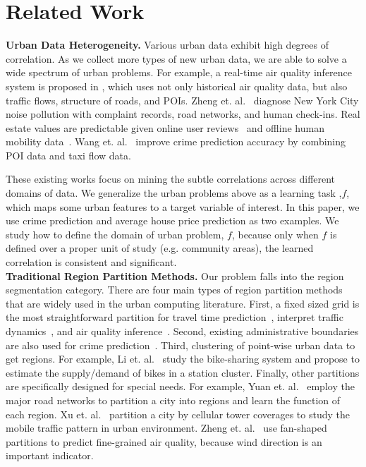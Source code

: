 \section{Related Work}
\label{sec:related-work}


\textbf{Urban Data Heterogeneity.} Various urban data exhibit high degrees of correlation. As we collect more types of new urban data, we are able to solve a wide spectrum of urban problems. For example, a real-time air quality inference system is proposed in \cite{zheng2013u}, which uses not only historical air quality data, but also traffic flows, structure of roads, and POIs. Zheng et. al.~\cite{zheng2014diagnosing} diagnose New York City noise pollution with complaint records, road networks, and human check-ins. Real estate values are predictable given online user reviews~\cite{fu2014sparse} and offline human mobility data~\cite{wang:region}. Wang et. al.~\cite{wang2016crime, wang2017non} improve crime prediction accuracy by combining POI data and taxi flow data.

These existing works focus on mining the subtle correlations across different domains of data. We generalize the urban problems above as a learning task ,$f$, which maps some urban features to a target variable of interest. In this paper, we use crime prediction and average house price prediction as two examples. We study how to define the domain of urban problem, $f$, because only when $f$ is defined over a proper unit of study (e.g. community areas), the learned correlation is consistent and significant. \\

\noindent\textbf{Traditional Region Partition Methods.} Our problem falls into the region segmentation category. There are four main types of region partition methods that are widely used in the urban computing literature. First, a fixed sized grid is the most straightforward partition for travel time prediction~\cite{wang2016simple}, interpret traffic dynamics~\cite{wu2016interpreting}, and air quality inference~\cite{zheng2013u}. Second, existing administrative boundaries are also used for crime prediction~\cite{wang2016crime}. Third, clustering of point-wise urban data to get regions. For example, Li et. al.~\cite{li2015traffic} study the bike-sharing system and propose to estimate the supply/demand of bikes in a station cluster. Finally, other partitions are specifically designed for special needs. For example, Yuan et. al.~\cite{yuan2012discovering} employ the major road networks to partition a city into regions and learn the function of each region. Xu et. al.~\cite{xu2017understanding} partition a city by cellular tower coverages to study the mobile traffic pattern in urban environment. Zheng et. al.~\cite{zheng2015forecasting} use fan-shaped partitions to predict fine-grained air quality, because wind direction is an important indicator.


